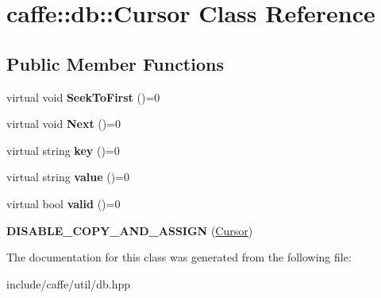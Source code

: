 \hypertarget{classcaffe_1_1db_1_1Cursor}{}\section{caffe\+:\+:db\+:\+:Cursor Class Reference}
\label{classcaffe_1_1db_1_1Cursor}
\subsection*{Public Member Functions}
\begin{DoxyCompactItemize}
\item 
virtual void {\bfseries Seek\+To\+First} ()=0\hypertarget{classcaffe_1_1db_1_1Cursor_a07896b619ea1e802b8d3b55782ef3a8a}{}\label{classcaffe_1_1db_1_1Cursor_a07896b619ea1e802b8d3b55782ef3a8a}

\item 
virtual void {\bfseries Next} ()=0\hypertarget{classcaffe_1_1db_1_1Cursor_ab90dc953417f37d0d4247b125ea1ae37}{}\label{classcaffe_1_1db_1_1Cursor_ab90dc953417f37d0d4247b125ea1ae37}

\item 
virtual string {\bfseries key} ()=0\hypertarget{classcaffe_1_1db_1_1Cursor_a87ec068564018e9218360db6fb1dade3}{}\label{classcaffe_1_1db_1_1Cursor_a87ec068564018e9218360db6fb1dade3}

\item 
virtual string {\bfseries value} ()=0\hypertarget{classcaffe_1_1db_1_1Cursor_ad6de2be246e7b46c00d34c29b24e16ee}{}\label{classcaffe_1_1db_1_1Cursor_ad6de2be246e7b46c00d34c29b24e16ee}

\item 
virtual bool {\bfseries valid} ()=0\hypertarget{classcaffe_1_1db_1_1Cursor_ae3811414ce9044a639195462be9e4f38}{}\label{classcaffe_1_1db_1_1Cursor_ae3811414ce9044a639195462be9e4f38}

\item 
{\bfseries D\+I\+S\+A\+B\+L\+E\+\_\+\+C\+O\+P\+Y\+\_\+\+A\+N\+D\+\_\+\+A\+S\+S\+I\+GN} (\hyperlink{classcaffe_1_1db_1_1Cursor}{Cursor})\hypertarget{classcaffe_1_1db_1_1Cursor_acbd3ccf06a180bd19079a2fec0a6a8f2}{}\label{classcaffe_1_1db_1_1Cursor_acbd3ccf06a180bd19079a2fec0a6a8f2}

\end{DoxyCompactItemize}


The documentation for this class was generated from the following file\+:\begin{DoxyCompactItemize}
\item 
include/caffe/util/db.\+hpp\end{DoxyCompactItemize}
